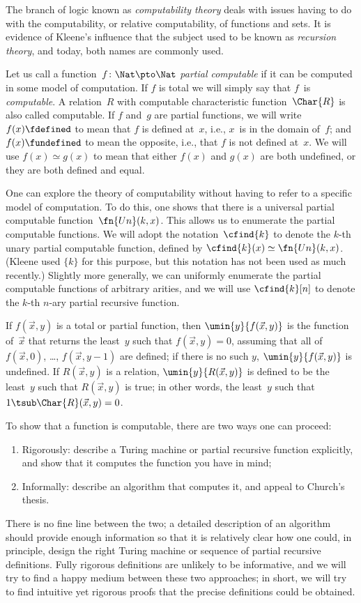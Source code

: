\documentclass[../../../include/open-logic-section]{subfiles}
\begin{document}

The branch of logic known as \emph{computability theory} deals with
issues having to do with the computability, or relative computability,
of functions and sets. It is evidence of Kleene's influence
that the subject used to be known as \emph{recursion theory}, and
today, both names are commonly used.

Let us call a function~$f\colon \Nat \pto \Nat$ \emph{partial
  computable} if it can be computed in some model of computation. If
$f$ is total we will simply say that $f$~is \emph{computable}. A
relation~$R$ with computable characteristic function~$\Char{R}$ is
also called computable. If $f$ and~$g$ are partial functions, we will
write $f(x) \fdefined$ to mean that $f$ is defined at~$x$, i.e., $x$~is
in the domain of~$f$; and $f(x) \fundefined$ to mean the opposite,
i.e., that $f$ is not defined at~$x$. We will use $f(x) \simeq g(x)$
to mean that either $f(x)$ and $g(x)$ are both undefined, or they are
both defined and equal.

One can explore the theory of computability without having to refer to
a specific model of computation. To do this, one shows that there is a
universal partial computable function~$\fn{Un}(k, x)$. This allows us
to enumerate the partial computable functions. We will adopt the
notation~$\cfind{k}$ to denote the $k$-th unary partial computable
function, defined by $\cfind{k}(x) \simeq \fn{Un}(k, x)$. (Kleene used
$\{ k \}$ for this purpose, but this notation has not been used as
much recently.)  Slightly more generally, we can uniformly enumerate
the partial computable functions of arbitrary arities, and we will use
$\cfind{k}[n]$ to denote the $k$-th $n$-ary partial recursive
function.

If $f(\vec x, y)$ is a total or partial function, then $\umin{y}{f
(\vec x, y)}$ is the function of~$\vec x$ that returns the least~$y$
such that $f(\vec x, y) = 0$, assuming that all of $f(\vec x, 0)$,
\dots, $f(\vec x, y-1)$ are defined; if there is no such $y$,
$\umin{y}{f (\vec x, y)}$ is undefined. If $R(\vec x, y)$ is a
relation, $\umin{y}{R(\vec x, y)}$ is defined to be the least~$y$ such
that $R(\vec x, y)$ is true; in other words, the least~$y$ such that
$1 \tsub \Char{R}(\vec x, y) = 0$.

To show that a function is computable, there are
two ways one can proceed:
\begin{enumerate}
\item Rigorously: describe a Turing machine or partial recursive
  function explicitly, and show that it computes the function you have
  in mind;
\item Informally: describe an algorithm that computes it, and appeal to
  Church's thesis.
\end{enumerate}
There is no fine line between the two; a detailed description of
an algorithm should provide enough information so that it is
relatively clear how one could, in principle, design the right Turing
machine or sequence of partial recursive definitions. Fully rigorous
definitions are unlikely to be informative, and we will try to find a
happy medium between these two approaches; in short, we will try to
find intuitive yet rigorous proofs that the precise definitions could
be obtained.
\end{document}
